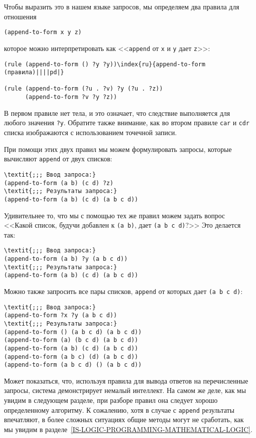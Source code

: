 Чтобы выразить это в нашем языке запросов, мы определяем
два правила для отношения

\begin{Verbatim}[fontsize=\small]
(append-to-form x y z)
\end{Verbatim}
которое можно интерпретировать как <<{\tt append} от
{\tt x} и {\tt y} дает {\tt z}>>:

\begin{Verbatim}[fontsize=\small]
(rule (append-to-form () ?y ?y))\index{ru}{append-to-form (правила)||||pd|}

(rule (append-to-form (?u . ?v) ?y (?u . ?z))
      (append-to-form ?v ?y ?z))
\end{Verbatim}
В первом 
правиле нет тела, и это означает, что следствие выполняется
для любого значения {\tt ?y}.  Обратите также внимание, как во
втором правиле {\tt car} и {\tt cdr} списка изображаются
с использованием точечной записи.

При помощи этих двух правил мы можем формулировать запросы,
которые вычисляют {\tt append} от двух списков:

\begin{Verbatim}[fontsize=\small]
\textit{;;; Ввод запроса:}
(append-to-form (a b) (c d) ?z)
\textit{;;; Результаты запроса:}
(append-to-form (a b) (c d) (a b c d))
\end{Verbatim}
Удивительнее то, что мы с помощью тех же правил можем задать вопрос
<<Какой список, будучи добавлен к {\tt (a b)}, дает {\tt (a b
c d)}?>> Это делается так:

\begin{Verbatim}[fontsize=\small]
\textit{;;; Ввод запроса:}
(append-to-form (a b) ?y (a b c d))
\textit{;;; Результаты запроса:}
(append-to-form (a b) (c d) (a b c d))
\end{Verbatim}
Можно также запросить все пары списков, {\tt append} от
которых дает {\tt (a b c d)}:

\begin{Verbatim}[fontsize=\small]
\textit{;;; Ввод запроса:}
(append-to-form ?x ?y (a b c d))
\textit{;;; Результаты запроса:}
(append-to-form () (a b c d) (a b c d))
(append-to-form (a) (b c d) (a b c d))
(append-to-form (a b) (c d) (a b c d))
(append-to-form (a b c) (d) (a b c d))
(append-to-form (a b c d) () (a b c d))
\end{Verbatim}

Может показаться, что, используя правила для вывода
ответов на перечисленные запросы, система демонстрирует немалый
интеллект.  На самом же деле, как мы увидим в следующем разделе,
при разборе правил она следует хорошо определенному алгоритму.  К
сожалению, хотя в случае с {\tt append} результаты впечатляют,
в более сложных ситуациях общие методы могут не сработать, как мы
увидим в 
разделе~\ref{IS-LOGIC-PROGRAMMING-MATHEMATICAL-LOGIC}.

